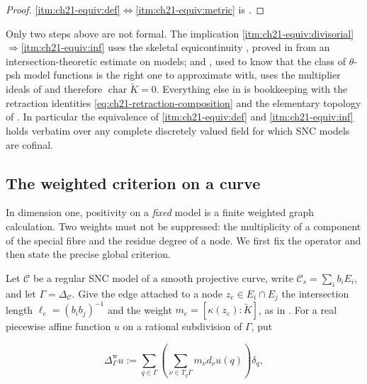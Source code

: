 \begin{proof}
\cref{itm:ch21-equiv:def}$\Leftrightarrow$\cref{itm:ch21-equiv:metric} is
.
\end{proof}

\begin{remark}
\label{rem:ch21-which-deep}
Only two steps above are not formal.  The implication
\cref{itm:ch21-equiv:divisorial}$\Rightarrow$\cref{itm:ch21-equiv:inf} uses the
skeletal equicontinuity , proved in
 from an intersection-theoretic estimate on
models; and , used to know that the class
of $\theta$-psh model functions is the right one to approximate with, uses
the multiplier ideals of  and therefore
$\operatorname{char}\widetilde K=0$.  Everything else in
 is bookkeeping with the retraction identities
\eqref{eq:ch21-retraction-composition} and the elementary topology of
.  In particular the equivalence of
\cref{itm:ch21-equiv:def} and \cref{itm:ch21-equiv:inf} holds verbatim over any
complete discretely valued field for which SNC models are cofinal.
\end{remark}

\subsection{The weighted criterion on a curve}
\label{sec:ch21-equivalent-curve}

In dimension one, positivity on a \emph{fixed} model is a finite weighted
graph calculation.  Two weights must not be suppressed: the multiplicity of
a component of the special fibre and the residue degree of a node.  We first
fix the operator and then state the precise global criterion.

Let $\mathcal C$ be a regular SNC model of a smooth projective curve, write
$\mathcal C_s=\sum_i b_iE_i$, and let $\Gamma=\Delta_{\mathcal C}$.
Give the edge attached to a node $z_e\in E_i\cap E_j$ the intersection
length $\ell_e=(b_ib_j)^{-1}$ and the weight
$m_e=[\kappa(z_e):\widetilde K]$, as in
.  For a real piecewise affine function
$u$ on a rational subdivision of $\Gamma$, put

\begin{equation}
\label{eq:ch21-weighted-graph-laplacian}
 \Delta^{\mathrm w}_{\Gamma}u
 :=\sum_{q\in\Gamma}
   \left(\sum_{\nu\in T_q\Gamma}m_\nu d_\nu u(q)\right)\delta_q,
\end{equation}

